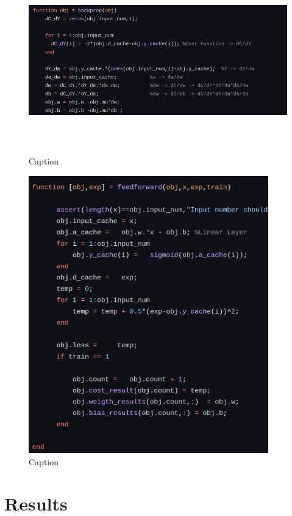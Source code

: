 \documentclass{article}
\begin{document}
\begin{figure}[h]
    \includegraphics[width=1\linewidth, height=8cm ]{pics/backpropcode.png}
    \caption{Caption}
    \label{fig:my_label}
\end{figure}

\begin{figure}[h]
    \includegraphics[width=1\linewidth, height=12cm ]{pics/forwardprop_code.png}
    \caption{Caption}
    \label{fig:my_label}
\end{figure}
\section{Results}
\end{document}
